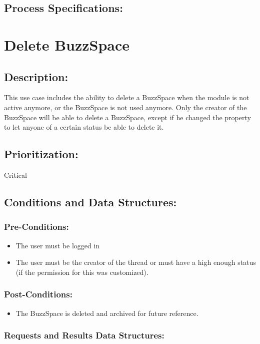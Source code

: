 \documentclass[a4paper,11pt]{article}
\begin{document}
\subsection{Process Specifications:} 

\section{Delete BuzzSpace}
\subsection*{Description:}This use case includes the ability to delete a BuzzSpace when the module is not active anymore, or the BuzzSpace is not used anymore. Only the creator of the 
BuzzSpace will be able to delete a BuzzSpace, except if he changed the property to let anyone of a certain status be able to delete it.
\subsection{Prioritization:} Critical
\subsection{Conditions and Data Structures:}
\subsubsection*{Pre-Conditions:}
\begin{itemize}
	\item The user must be logged in
	\item The user must be the creator of the thread or must have a high enough status (if the permission for this was customized).
\end{itemize}
\subsubsection*{Post-Conditions:}
\begin{itemize}
	\item The BuzzSpace is deleted and archived for future reference. 
\end{itemize}
\subsubsection*{Requests and Results Data Structures:}
\end{document}
